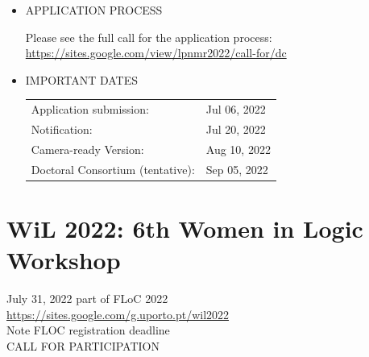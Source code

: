 \documentclass[prodmode,acmtecs]{acmsmall} %
\begin{document}
\begin{itemize}
\item  APPLICATION PROCESS 
 
   Please see the full call for the application process: \href{https://sites.google.com/view/lpnmr2022/call-for/dc}{https://sites.google.com/view/lpnmr2022/call-for/dc} 
 
\item  IMPORTANT DATES 
 
\begin{tabulary}{\linewidth}{LL}Application submission:  & Jul 06, 2022 \\
Notification:  & Jul 20, 2022 \\
Camera-ready Version:  & Aug 10, 2022 \\
Doctoral Consortium (tentative):  & Sep 05, 2022 \\
\end{tabulary}
 
\end{itemize}\section{WiL 2022: 6th Women in Logic Workshop}\label{WiL2022}  July 31, 2022 part of FLoC 2022\\ 
  \href{https://sites.google.com/g.uporto.pt/wil2022}{https://sites.google.com/g.uporto.pt/wil2022}\\ 
  Note FLOC registration deadline\\ 
CALL FOR PARTICIPATION 
\end{document}
